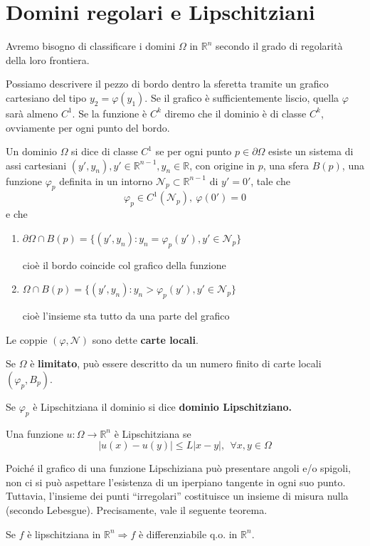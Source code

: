 \documentclass[10pt,a4paper,twoside,openright]{book}
\begin{document}
\section{Domini regolari e Lipschitziani}

Avremo bisogno di classificare i domini $\Omega $ in $\mathbb{R}^{n}$ secondo il grado di regolarità della loro frontiera.

Possiamo descrivere il pezzo di bordo dentro la sferetta tramite un grafico cartesiano del tipo $y_{2} =\varphi (y_{1})$. Se il grafico è sufficientemente liscio, quella $\varphi $ sarà almeno $C^{1}$. Se la funzione è $C^{k}$ diremo che il dominio è di classe $C^{k}$, ovviamente per ogni punto del bordo.


\begin{definition}
	Un dominio $\Omega $ si dice di classe $C^{1}$ se per ogni punto $p\in \partial \Omega $ esiste un sistema di assi cartesiani $(y',y_{n}),y'\in \mathbb{R}^{n-1},y_{n} \in \mathbb{R}$, con origine in $p$, una sfera $B(p)$, una funzione $\varphi _{p}$ definita in un intorno $\mathcal{N}_{p} \subset \mathbb{R}^{n-1}$ di $y'=0'$, tale che
	\begin{equation*}
	\varphi _{p} \in C^{1}(\mathcal{N}_{p}),\ \varphi (0') =0
	\end{equation*}
	e che
	\begin{enumerate}
	\item $\partial \Omega \cap B(p) =\{(y',y_{n}) :y_{n} =\varphi _{p}(y'),y'\in \mathcal{N}_{p}\}$

	cioè il bordo coincide col grafico della funzione
	\item $\Omega \cap B(p) =\{(y',y_{n}) :y_{n}  >\varphi _{p}(y'),y'\in \mathcal{N}_{p}\}$

	cioè l'insieme sta tutto da una parte del grafico
	\end{enumerate}
\end{definition}

Le coppie $( \varphi,\mathcal{N})$ sono dette \textbf{carte locali}.

Se $\Omega $ è \textbf{limitato}, può essere descritto da un numero finito di carte locali $( \varphi _{p},B_{p})$.

Se $\varphi _{p}$ è Lipschitziana il dominio si dice \textbf{dominio Lipschitziano.}
\begin{definition}
 Una funzione $u:\Omega \rightarrow \mathbb{R}^{n}$ è Lipschitziana se
\begin{equation*}
| u(x) -u(y)| \leqslant L| x-y|,\ \ \forall x,y\in \Omega 
\end{equation*}
\end{definition}
Poiché il grafico di una funzione Lipschiziana può presentare angoli e/o spigoli, non ci si può aspettare l’esistenza di un iperpiano tangente in ogni suo punto. Tuttavia, l’insieme dei punti ``irregolari'' costituisce un insieme di misura nulla (secondo Lebesgue). Precisamente, vale il seguente teorema.
\begin{theorem}
[di Rademacher] Se $f$ è lipschitziana in $\mathbb{R}^{n} \Rightarrow f$ è differenziabile q.o. in $\mathbb{R}^{n}$.
\end{theorem}
\end{document}

